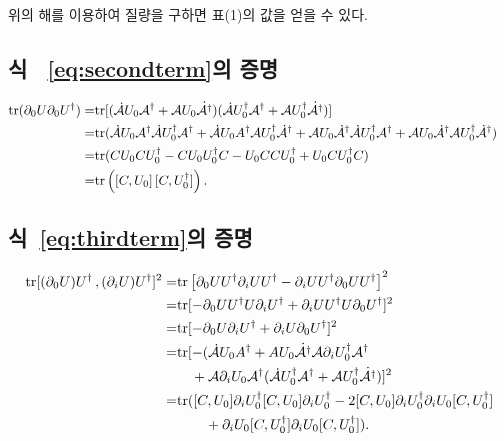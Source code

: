 \documentclass[superscriptaddress,
nofootinbib,byrevtex,fleqn,prd,12pt]{revtex4}
\newcommand{\tr}{\mathrm{tr}}
\begin{document}
위의 해를 이용하여 질량을 구하면 표(1)의 값을 얻을 수 있다.
\subsection{식 ~\eqref{eq:secondterm}의 증명}\label{53}

\begin{align}
\tr(\partial_0 U\partial_0 U^\dagger)=&\tr[(\dot{\mathcal{A}}U_0 \mathcal{A}^\dagger+\mathcal{A}U_0\dot{\mathcal{A}^\dagger})(\dot{\mathcal{A}}U_0 ^\dagger \mathcal{A}^\dagger+\mathcal{A}U_0 ^\dagger \dot{\mathcal{A}^\dagger})]\cr
=&\tr(\dot{\mathcal{A}}U_0 \mathcal{A}^\dagger \dot{\mathcal{A}}U_0^\dagger \mathcal{A}^\dagger +\dot{\mathcal{A}}U_0A^\dagger \mathcal{A}U_0^\dagger \dot{\mathcal{A}}^\dagger
+\mathcal{A}U_0 \dot{\mathcal{A}}^\dagger \dot{\mathcal{A}} U_0^\dagger \mathcal{A}^\dagger +\mathcal{A}U_0\dot{\mathcal{A}}^\dagger \mathcal{A}U_0^\dagger \dot{\mathcal{A}}^\dagger)\cr
=&\tr(CU_0CU_0^\dagger-CU_0U_0^\dagger C-U_0CCU_0^\dagger+U_0CU_0^\dagger C)\cr
=&\tr\left(\left[C,U_0\right][C,U_0^\dagger]\right).
\end{align}

\subsection{식~\eqref{eq:thirdterm}의 증명}\label{54}

\begin{align}
\tr[(\partial_0 U) U^\dagger \, ,(\partial_i U)U^\dagger]^2=&\tr\left[\partial_0UU^\dagger \partial_iUU^\dagger-\partial_iUU^\dagger\partial_0UU^\dagger\right]^2\nonumber\\
=&\tr[-\partial_0 UU^\dagger U\partial_i U^\dagger +\partial_i UU^\dagger U \partial_0 U^\dagger]^2\nonumber\\
=&\tr[-\partial_0U\partial_i U^\dagger + \partial_i U \partial_0 U^\dagger]^2\nonumber\\
=&\tr[-(\dot{\mathcal{A}}U_0A^\dagger+AU_0\dot{\mathcal{A}^\dagger}\mathcal{A}\partial_i U_0^\dagger \mathcal{A}^\dagger\cr
&\quad+\mathcal{A}\partial_i U_0\mathcal{A}^\dagger(\dot{\mathcal{A}}U_0^\dagger \mathcal{A}^\dagger+\mathcal{A}U_0^\dagger \dot{\mathcal{A}^\dagger})]^2\nonumber\\
=&\tr([C,U_0]\partial_iU_0^\dagger [C,U_0]\partial_i U_0^\dagger -2[C,U_0]\partial_i U_0^\dagger\partial_i U_0[C,U_0^\dagger]\cr
&\qquad+\partial_i U_0[C,U_0^\dagger]\partial_iU_0[C,U_0^\dagger]).
\end{align}
\end{document}
